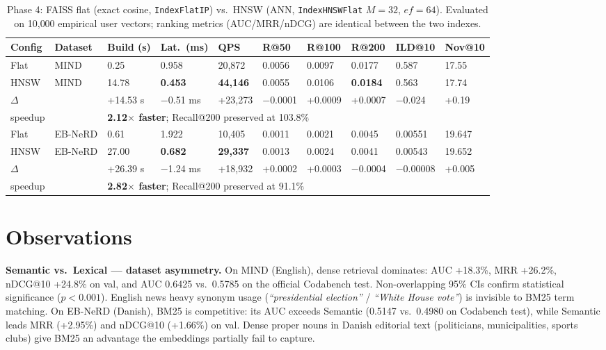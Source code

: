 \documentclass[11pt,a4paper]{article}
\begin{document}
\begin{table}[h!]
  \centering
  \caption{Phase 4: FAISS flat (exact cosine, \texttt{IndexFlatIP}) vs.\ HNSW (ANN, \texttt{IndexHNSWFlat} $M{=}32$, $ef{=}64$).
  Evaluated on 10{,}000 empirical user vectors; ranking metrics (AUC/MRR/nDCG) are identical between the two indexes.}
  \label{tab:ablation_p4}
  \small
  \setlength{\tabcolsep}{3pt}
  \begin{tabularx}{\linewidth}{l l X X X X X X X X}
    \toprule
    Config & Dataset & Build (s) & Lat.~(ms) & QPS & R@50 & R@100 & R@200 & ILD@10 & Nov@10 \\
    \midrule
    Flat  & MIND    & 0.25  & 0.958 & 20{,}872 & 0.0056 & 0.0097 & 0.0177 & 0.587 & 17.55 \\
    HNSW  & MIND    & 14.78 & \textbf{0.453} & \textbf{44{,}146} & 0.0055 & 0.0106 & \textbf{0.0184} & 0.563 & 17.74 \\
    \quad$\Delta$ & & +14.53 s & $-$0.51 ms & +23{,}273 & $-$0.0001 & +0.0009 & +0.0007 & $-$0.024 & +0.19 \\
    \quad speedup & & \multicolumn{7}{l}{\textbf{2.12$\times$ faster}; Recall@200 preserved at 103.8\%} \\
    \midrule
    Flat  & EB-NeRD & 0.61  & 1.922 & 10{,}405 & 0.0011 & 0.0021 & 0.0045 & 0.00551 & 19.647 \\
    HNSW  & EB-NeRD & 27.00 & \textbf{0.682} & \textbf{29{,}337} & 0.0013 & 0.0024 & 0.0041 & 0.00543 & 19.652 \\
    \quad$\Delta$ & & +26.39 s & $-$1.24 ms & +18{,}932 & +0.0002 & +0.0003 & $-$0.0004 & $-$0.00008 & +0.005 \\
    \quad speedup & & \multicolumn{7}{l}{\textbf{2.82$\times$ faster}; Recall@200 preserved at 91.1\%} \\
    \bottomrule
  \end{tabularx}
\end{table}
\FloatBarrier
\section{Observations}

\textbf{Semantic vs.\ Lexical --- dataset asymmetry.}
On MIND (English), dense retrieval dominates: AUC +18.3\%, MRR +26.2\%, nDCG@10 +24.8\% on val, and AUC 0.6425 vs.\ 0.5785 on the official Codabench test.  Non-overlapping 95\% CIs confirm statistical significance ($p{<}0.001$).  English news heavy synonym usage (\textit{``presidential election''} / \textit{``White House vote''}) is invisible to BM25 term matching.  On EB-NeRD (Danish), BM25 is competitive: its AUC exceeds Semantic (0.5147 vs.\ 0.4980 on Codabench test), while Semantic leads MRR (+2.95\%) and nDCG@10 (+1.66\%) on val.  Dense proper nouns in Danish editorial text (politicians, municipalities, sports clubs) give BM25 an advantage the embeddings partially fail to capture.
\end{document}
